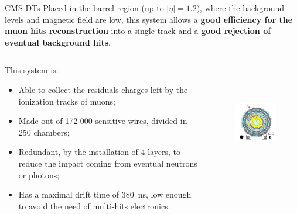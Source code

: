 \documentclass[8pt]{beamer}
\begin{document}
\begin{frame}{CMS DTs}
\justifying
\vspace{5pt}
Placed in the barrel region (up to $|\eta| = 1.2$), where the background levels and magnetic field are low, this system allows a \textbf{good efficiency for the muon hits reconstruction} into a single track and a \textbf{good rejection of eventual background hits}. \vfill

\begin{columns}
	\begin{column}{0.48 \textwidth}
	\justifying
This system is:
\begin{itemize}
\justifying
\item Able to collect the residuals charges left by the ionization tracks of muons;
\item Made out of 172 000 sensitive wires, divided in 250 chambers;
\item Redundant, by the installation of 4 layers, to reduce the impact coming from eventual neutrons or photons;
\item Has a maximal drift time of 380~ns, low enough to avoid the need of multi-hits electronics.
\end{itemize}
\end{column}
	\begin{column}{0.51 \textwidth}
\begin{figure}[htbp]
\begin{center}
\includegraphics[width=6cm, height=5.2cm]{figs/CMSDT.png}
\end{center}
\end{figure}
	\end{column}
	\end{columns} \vfill
\end{frame}
\end{document}

